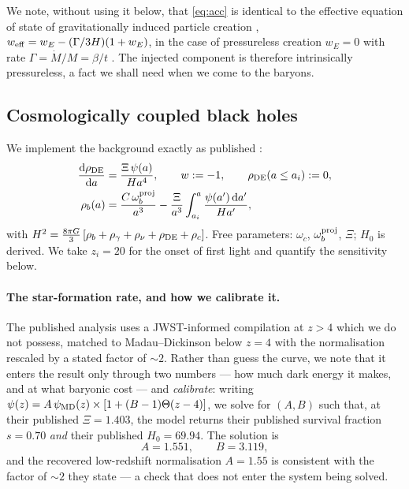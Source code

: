 \documentclass[11pt,a4paper]{article}
\begin{document}
We note, without using it below, that \eqref{eq:acc} is identical to the effective equation of
state of gravitationally induced particle creation \citep{Prigogine1989,CLW1992},
$w_{\rm eff} = w_E - (\Gamma/3H)(1+w_E)$, in the case of pressureless creation $w_E = 0$ with rate
$\Gamma = \dot M/M = \beta/t$ \citep{Schiavone2026}. The injected component is therefore
intrinsically pressureless, a fact we shall need when we come to the baryons.

\subsection{Cosmologically coupled black holes}
We implement the background exactly as published \citep[\S2]{Croker2024}:
\begin{align}
\frac{\mathrm{d}\rho_{\rm DE}}{\mathrm{d}a} &= \frac{\Xi\,\psi(a)}{H a^4}, \qquad w := -1,
\qquad \rho_{\rm DE}(a \leq a_i) := 0, \\
\rho_b(a) &= \frac{C\,\omega_b^{\rm proj}}{a^3}
 - \frac{\Xi}{a^3}\int_{a_i}^{a}\frac{\psi(a')\,\mathrm{d}a'}{H a'},
\end{align}
with $H^2 = \tfrac{8\pi G}{3}\left[\rho_b + \rho_\gamma + \rho_\nu + \rho_{\rm DE} + \rho_c\right]$.
Free parameters: $\omega_c$, $\omega_b^{\rm proj}$, $\Xi$; $H_0$ is derived. We take
$z_i = 20$ for the onset of first light and quantify the sensitivity below.

\paragraph{The star-formation rate, and how we calibrate it.} The published analysis uses a
JWST-informed compilation at $z > 4$ which we do not possess, matched to Madau--Dickinson
\citep{MD2014} below $z=4$ with the normalisation rescaled by a stated factor of $\sim\!2$. Rather
than guess the curve, we note that it enters the result only through two numbers --- how much dark
energy it makes, and at what baryonic cost --- and \emph{calibrate}: writing
$\psi(z) = A\,\psi_{\rm MD}(z)\times[1 + (B-1)\Theta(z-4)]$, we solve for $(A,B)$ such that, at
their published $\Xi = 1.403$, the model returns their published survival fraction $s = 0.70$
\emph{and} their published $H_0 = 69.94$. The solution is
\begin{equation}
A = 1.551, \qquad B = 3.119,
\end{equation}
and the recovered low-redshift normalisation $A = 1.55$ is consistent with the factor of $\sim\!2$
they state --- a check that does not enter the system being solved.
\end{document}
